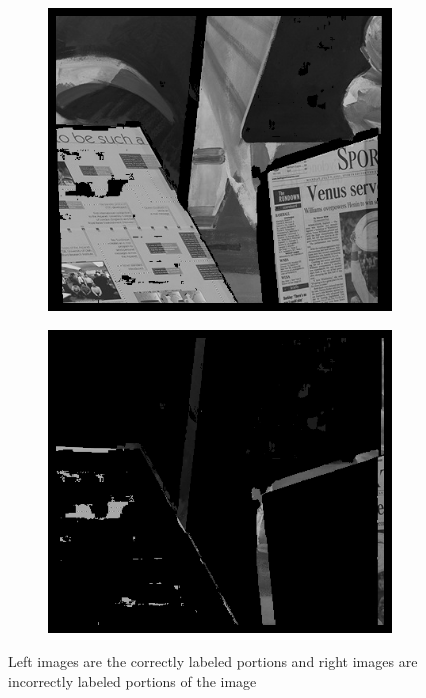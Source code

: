 \documentclass[letterpaper,12pt]{article}
\begin{document}
\begin{figure}[!h]
\begin{subfigure}[b]{0.30\textwidth}
         \end{subfigure}
         \\
        \begin{subfigure}[b]{0.30\textwidth}
                \includegraphics[width=\textwidth]{correct-venusO.png}

        \end{subfigure}%
        \quad
        \begin{subfigure}[b]{0.30\textwidth}
                \includegraphics[width=\textwidth]{icorrect-venusO.png}

         \end{subfigure}
        \caption{Left images are the correctly labeled portions and right images are incorrectly labeled portions of the image}\label{fig:cut}
\end{figure}
\end{document}
